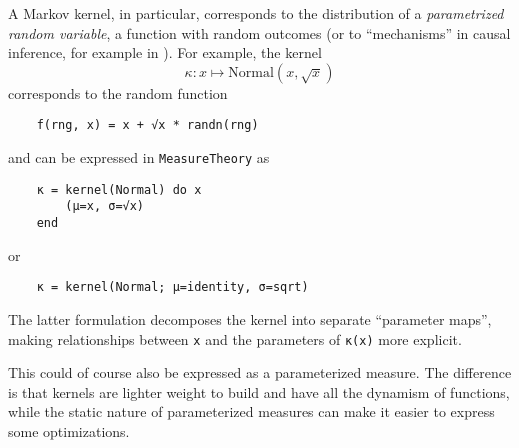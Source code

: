 \documentclass{juliacon}
\newcommand{\chad}[2][] {\todo[inline,backgroundcolor=orange!20!white, size=\footnotesize,#1]{(Chad) #2 }}
\newcommand{\moritz}[2][] {\todo[inline,backgroundcolor=blue!10!white, size=\footnotesize,#1]{(Moritz) #2 }}
\begin{document}
A Markov kernel, in particular, corresponds to the distribution of a \emph{parametrized random variable}, a function with random outcomes (or to ``mechanisms'' in causal inference, for example in \cite{https://doi.org/10.5281/zenodo.1005091}). For example, the kernel
\[
\kappa\colon x \mapsto \text{Normal}(x,\sqrt{x})
\]
corresponds to the random function
\begin{verbatim}
    f(rng, x) = x + √x * randn(rng)
\end{verbatim}
and can be expressed in \verb|MeasureTheory| as
\begin{verbatim}
    κ = kernel(Normal) do x
        (μ=x, σ=√x)
    end
\end{verbatim}
or
\begin{verbatim}
    κ = kernel(Normal; μ=identity, σ=sqrt)
\end{verbatim}

The latter formulation decomposes the kernel into separate ``parameter maps'', making relationships between \verb|x| and the parameters of \verb|κ(x)| more explicit.

This could of course also be expressed as a parameterized measure. The difference is that kernels are lighter weight to build and have all the dynamism of functions, while the static nature of parameterized measures can make it easier to express some optimizations.




\end{document}
